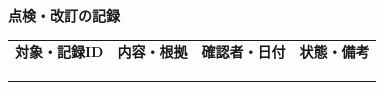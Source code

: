 \documentclass[11pt,a4paper]{article}
\begin{document}
\par{}\noindent\textbf{点検・改訂の記録}\par\vspace{1mm}
{\fontsize{8.5}{13}\selectfont
\begin{tabularx}{\linewidth}{@{}XXXX@{}}
\textbf{対象・記録ID} & \textbf{内容・根拠} & \textbf{確認者・日付} & \textbf{状態・備考}\\[2mm]
\strut & \strut & \strut & \strut\\[5mm]
\strut & \strut & \strut & \strut\\[5mm]
\strut & \strut & \strut & \strut\\[5mm]
\end{tabularx}
}\vspace{2mm}\par
\end{document}
